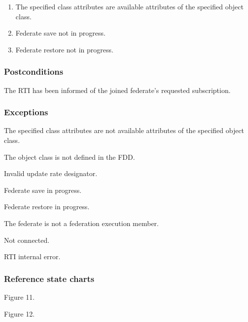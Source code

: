 \clearpage

\begin{compactstdpage}
    \begin{enumerate}[label=\alph*),leftmargin=2.35em,itemsep=1pt,topsep=3pt,parsep=0pt,start=5]
\item The specified class attributes are available attributes of the specified object class.
\item Federate save not in progress.
\item Federate restore not in progress.
    \end{enumerate}

    \subsubsection{Postconditions}
    \begin{stdalphalist}
        \item The RTI has been informed of the joined federate's requested subscription.
    \end{stdalphalist}

    \subsubsection{Exceptions}
    \begin{stdalphalist}
        \item The specified class attributes are not available attributes of the specified object class.
        \item The object class is not defined in the FDD.
        \item Invalid update rate designator.
        \item Federate save in progress.
        \item Federate restore in progress.
        \item The federate is not a federation execution member.
        \item Not connected.
        \item RTI internal error.
    \end{stdalphalist}

    \subsubsection{Reference state charts}
    \begin{stdalphalist}
        \item Figure 11.\item Figure 12.
    \end{stdalphalist}


\end{compactstdpage}
